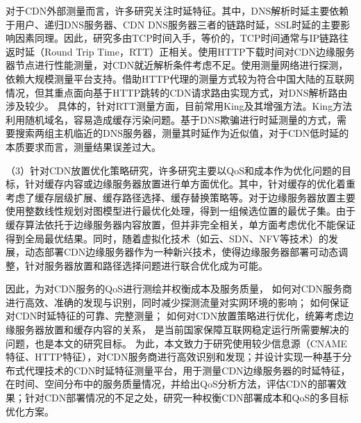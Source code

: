 对于CDN外部测量而言，许多研究关注时延特征。其中，DNS解析时延主要依赖于用户、递归DNS服务器、CDN DNS服务器三者的链路时延，SSL时延的主要影响因素同理。因此，研究多由TCP时间入手，等价的，TCP时间通常与IP链路往返时延（Round Trip Time，RTT）正相关。使用HTTP下载时间对CDN边缘服务器节点进行性能测量，对CDN就近解析条件考虑不足。使用测量网络进行探测，依赖大规模测量平台支持。借助HTTP代理的测量方式较为符合中国大陆的互联网情况，但其重点面向基于HTTP跳转的CDN请求路由实现方式，对DNS解析路由涉及较少。
具体的，针对RTT测量方面，目前常用King及其增强方法。King方法利用随机域名，容易造成缓存污染问题。基于DNS欺骗进行时延测量的方式，需要搜索两组主机临近的DNS服务器，测量其时延作为近似值，对于CDN低时延的本质要求而言，测量结果误差过大。

（3）针对CDN放置优化策略研究，许多研究主要以QoS和成本作为优化问题的目标，针对缓存内容或边缘服务器放置进行单方面优化。其中，针对缓存的优化着重考虑了缓存层级扩展、缓存路径选择、缓存替换策略等。对于边缘服务器放置主要使用整数线性规划对图模型进行最优化处理，得到一组候选位置的最优子集。由于缓存算法依托于边缘服务器内容放置，但并非完全相关，单方面考虑优化不能保证得到全局最优结果。同时，随着虚拟化技术（如云、SDN、NFV等技术）的发展，动态部署CDN边缘服务器作为一种新兴技术，使得边缘服务器部署可动态调整，针对服务器放置和路径选择问题进行联合优化成为可能。

 
因此，为对CDN服务的QoS进行测绘并权衡成本及服务质量，
如何对CDN服务商进行高效、准确的发现与识别，同时减少探测流量对实网环境的影响；
如何保证对CDN时延特征的可靠、完整测量；
如何对CDN放置策略进行优化，统筹考虑边缘服务器放置和缓存内容的关系，
是当前国家保障互联网稳定运行所需要解决的问题，也是本文的研究目标。
为此，本文致力于研究使用较少信息源（CNAME特征、HTTP特征），对CDN服务商进行高效识别和发现；并设计实现一种基于分布式代理技术的CDN时延特征测量平台，用于测量CDN边缘服务器的时延特征，在时间、空间分布中的服务质量情况，并给出QoS分析方法，评估CDN的部署效果；针对CDN部署情况的不足之处，研究一种权衡CDN部署成本和QoS的多目标优化方案。



